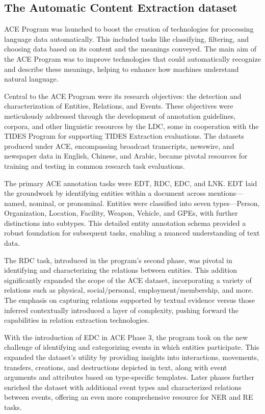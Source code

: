 \subsection{The Automatic Content Extraction dataset}
\label{sec:acedataset}

\ac{ACE} Program was launched to boost the creation of technologies for processing language data automatically\cite{ACE}. This included tasks like classifying, filtering, and choosing data based on its content and the meanings conveyed. The main aim of the ACE Program was to improve technologies that could automatically recognize and describe these meanings, helping to enhance how machines understand natural language.

Central to the ACE Program were its research objectives: the detection and characterization of Entities, Relations, and Events. These objectives were meticulously addressed through the development of annotation guidelines, corpora, and other linguistic resources by the \ac{LDC}, some in cooperation with the TIDES Program for supporting TIDES Extraction evaluations. The datasets produced under ACE, encompassing broadcast transcripts, newswire, and newspaper data in English, Chinese, and Arabic, became pivotal resources for training and testing in common research task evaluations.

The primary ACE annotation tasks were \ac{EDT}, \ac{RDC}, \ac{EDC}, and \ac{LNK}. EDT laid the groundwork by identifying entities within a document across mentions—named, nominal, or pronominal. Entities were classified into seven types—Person, Organization, Location, Facility, Weapon, Vehicle, and \ac{GPEs}, with further distinctions into subtypes. This detailed entity annotation schema provided a robust foundation for subsequent tasks, enabling a nuanced understanding of text data.

The RDC task, introduced in the program's second phase, was pivotal in identifying and characterizing the relations between entities. This addition significantly expanded the scope of the ACE dataset, incorporating a variety of relations such as physical, social/personal, employment/membership, and more. The emphasis on capturing relations supported by textual evidence versus those inferred contextually introduced a layer of complexity, pushing forward the capabilities in relation extraction technologies.

With the introduction of EDC in ACE Phase 3, the program took on the new challenge of identifying and categorizing events in which entities participate. This expanded the dataset's utility by providing insights into interactions, movements, transfers, creations, and destructions depicted in text, along with event arguments and attributes based on type-specific templates. Later phases further enriched the dataset with additional event types and characterized relations between events, offering an even more comprehensive resource for NER and RE tasks.

